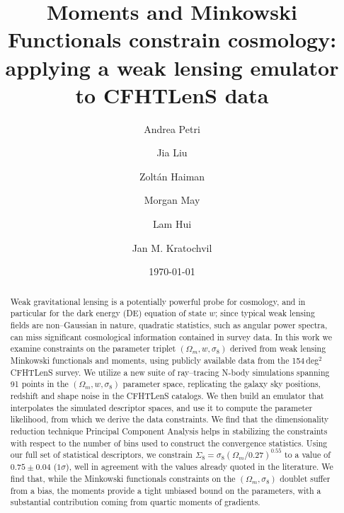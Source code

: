 \documentclass[reprint,aps,prd,superscriptaddress,showkeys,showpacs]{revtex4-1}
\begin{document}
\title{Moments and Minkowski Functionals constrain cosmology: applying a weak lensing emulator to CFHTLenS data}

\author{Andrea Petri}

\author{Jia Liu}

\author{Zolt\'an Haiman}

\author{Morgan May}

\author{Lam Hui}

\author{Jan M. Kratochvil}

\date{\today}

\label{firstpage}


\begin{abstract}
Weak gravitational lensing is a potentially powerful probe for cosmology, and in particular for the dark energy (DE) equation of state $w$; since typical weak lensing fields are non--Gaussian in nature, quadratic statistics, such as angular power spectra, can miss significant cosmological information contained in survey data. In this work we examine constraints on the parameter triplet $(\Omega_m,w,\sigma_8)$ derived from weak lensing Minkowski functionals and moments, using publicly available data from the 154\,deg$^2$ CFHTLenS survey. We utilize a new suite of ray--tracing N-body simulations spanning 91 points in the $(\Omega_m,w,\sigma_8)$ parameter space, replicating the galaxy sky positions, redshift and shape noise in the CFHTLenS catalogs. We then build an emulator that interpolates the simulated descriptor spaces, and use it to compute the parameter likelihood, from which we derive the data constraints. We find that the dimensionality reduction technique Principal Component Analysis helps in stabilizing the constraints with respect to the number of bins used to construct the convergence statistics. Using our full set of statistical descriptors, we constrain $\Sigma_8=\sigma_8(\Omega_m/0.27)^{0.55}$ to a value of $0.75\pm0.04$ ($1\sigma$), well in agreement with the values already quoted in the literature. We find that, while the Minkowski functionals constraints on the $(\Omega_m,\sigma_8)$ doublet suffer from a bias, the moments provide a tight unbiased bound on the parameters, with a substantial contribution coming from quartic moments of gradients.  

\end{abstract}
\end{document}
